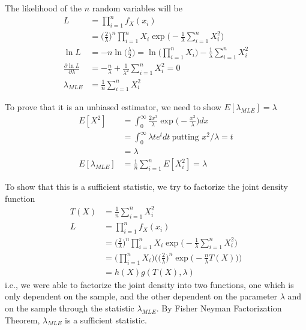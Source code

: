 \documentclass[../../probability-notes.tex]{subfiles}
\begin{document}
    The likelihood of the $n$ random variables will be
    \begin{align*}
        L &= \prod_{i=1}^{n} f_{X}(x_{i})\\
        &= \bigg( \frac{2}{\lambda} \bigg)^{n} \prod_{i=1}^{n} X_{i} \exp \bigg( -\frac{1}{\lambda} \sum_{i=1}^{n} X_{i}^{2} \bigg)\\
        \ln L &= -n \ln \bigg( \frac{\lambda}{2} \bigg) = \ln \bigg( \prod_{i=1}^{n} X_{i} \bigg) - \frac{1}{\lambda} \sum_{i=1}^{n} X_{i}^{2}\\
        \frac{\partial \ln L}{\partial \lambda} &= -\frac{n}{\lambda} + \frac{1}{\lambda^{2}}\sum_{i=1}^{n} X_{i}^{2} = 0\\
        \lambda_{MLE} &= \frac{1}{n} \sum_{i=1}^{n} X_{i}^{2}
    \end{align*}

    To prove that it is an unbiased estimator, we need to show $E[\lambda_{MLE}] = \lambda$
    \begin{align*}
        E[X^{2}] &= \int_{0}^{\infty} \frac{2x^{3}}{\lambda} \exp \bigg(-\frac{x^{2}}{\lambda} \bigg) dx\\
        &= \int_{0}^{\infty} \lambda t e^{t} dt \: \text{putting $x^{2}/\lambda = t$}\\
        &= \lambda\\
        E[\lambda_{MLE}] &= \frac{1}{n} \sum_{i=1}^{n} E[X_{i}^{2}] = \lambda
    \end{align*}

    To show that this is a sufficient statistic, we try to factorize the joint density function
    \begin{align*}
        T(X) &= \frac{1}{n} \sum_{i=1}^{n} X_{i}^{2}\\
        L &= \prod_{i=1}^{n} f_{X}(x_{i})\\
        &= \bigg( \frac{2}{\lambda} \bigg)^{n} \prod_{i=1}^{n} X_{i} \exp \bigg( -\frac{1}{\lambda} \sum_{i=1}^{n} X_{i}^{2} \bigg)\\
        &= \bigg( \prod_{i=1}^{n} X_{i} \bigg) \bigg( \bigg( \frac{2}{\lambda} \bigg)^{n} \exp \bigg( -\frac{n}{\lambda} T(X) \bigg) \bigg)\\
        &= h(X) g(T(X), \lambda)
    \end{align*}
    i.e., we were able to factorize the joint density into two functions, one which is only dependent on the sample, and the other dependent on the parameter $\lambda$ and on the sample through the statistic $\lambda_{MLE}$. By Fisher Neyman Factorization Theorem, $\lambda_{MLE}$ is a sufficient statistic.
\end{document}
